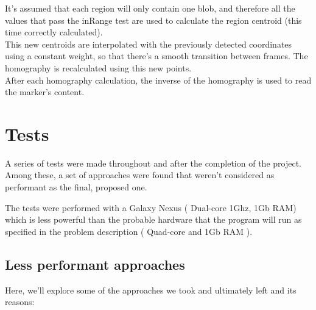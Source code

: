 \documentclass[DIV=calc, paper=a4, fontsize=11pt, twocolumn]{scrartcl}   %
\begin{document}
It's assumed that each region will only contain one blob, and therefore all the values that pass the inRange test are used to calculate the region centroid (this time correctly calculated).\\


This new centroids are interpolated with the previously detected coordinates using a constant weight, so that there's a smooth transition between frames. The homography is recalculated using this new points.\\


After each homography calculation, the inverse of the homography is used to read the marker's content.\\


\section*{Tests}

A series of tests were made throughout and after the completion of the project. Among these, a set of approaches were found that weren't considered as performant as the final, proposed one.

The tests were performed with a Galaxy Nexus ( Dual-core 1Ghz, 1Gb RAM) which is less powerful than the probable hardware that the program will run as specified in the problem description ( Quad-core and 1Gb RAM ).

\subsection*{Less performant approaches}
Here, we'll explore some of the approaches we took and ultimately left and its reasons:
\end{document}
